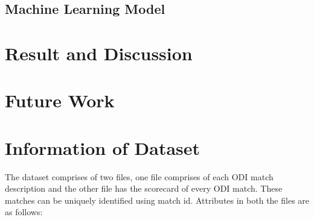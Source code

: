 \documentclass[fleqn,10pt]{wlscirep}
\begin{document}
\subsection{Machine Learning Model}
\section{Result and Discussion}
\section{Future Work}
\appendix
\section{Information of Dataset}
The dataset comprises of two files, one file comprises of each ODI match description and the other file has the scorecard of every ODI match. These matches can be uniquely
identified using match id. Attributes in both the files are as follows:
\end{document}

